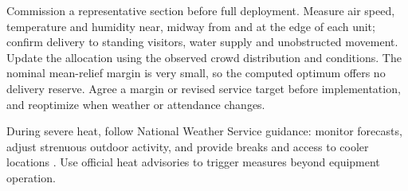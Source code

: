 Commission a representative section before full deployment. Measure air speed, temperature and humidity near, midway from and at the edge of each unit; confirm delivery to standing visitors, water supply and unobstructed movement. Update the allocation using the observed crowd distribution and conditions. The nominal mean-relief margin is very small, so the computed optimum offers no delivery reserve. Agree a margin or revised service target before implementation, and reoptimize when weather or attendance changes.

During severe heat, follow National Weather Service guidance: monitor forecasts, adjust strenuous outdoor activity, and provide breaks and access to cooler locations \cite{nws-heat}. Use official heat advisories to trigger measures beyond equipment operation.
